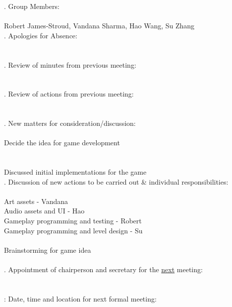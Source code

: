 \documentclass{article}
\begin{document}
. Group Members: \\\\ \indent Robert James-Stroud, Vandana Sharma, Hao Wang, Su Zhang \\

. Apologies for Absence: \\\\ \indent   \\

. Review of minutes from previous meeting: \\\\ \indent  \\

. Review of actions from previous meeting: \\\\ \indent \\

. New matters for consideration/discussion: \\\\ \indent Decide the idea for game development \\\\\\ \indent Discussed initial implementations for the game\\

. Discussion of new actions to be carried out \& individual responsibilities: \\\\ \indent Art assets - Vandana \\ \indent Audio assets and UI - Hao  \\ \indent Gameplay programming and testing - Robert \\\indent Gameplay programming and level design - Su \\\\ \indent Brainstorming for game idea\\\\

. Appointment of chairperson and secretary for the \underline{next} meeting: \\\\ \indent  \\

: Date, time and location for next formal meeting: \\\\ \indent  \\
\end{document}
